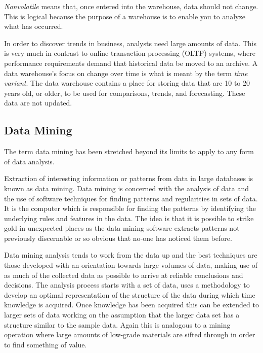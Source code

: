 \textit{Nonvolatile} means that, once entered into the warehouse, data should not change. This is
logical because the purpose of a warehouse is to enable you to analyze what has occurred.

In order to discover trends in business, analysts need large amounts of data. This is very much
in contrast to online transaction processing (OLTP) systems, where performance requirements
demand that historical data be moved to an archive. A data warehouse’s focus on change over time
is what is meant by the term \textit{time variant}. The data warehouse contains a place for storing data
that are 10 to 20 years old, or older, to be used for comparisons, trends, and forecasting. These
data are not updated.
\subsection*{Data Mining}

The term data mining has been stretched beyond its limits to apply to any form of data analysis. 

Extraction of interesting information or patterns from data in large databases is known as data
mining. Data mining is concerned with the analysis of data and the use of software techniques for
finding patterns and regularities in sets of data. It is the computer which is responsible for finding the patterns by identifying the underlying rules and features in the data. The idea is that it is possible
to strike gold in unexpected places as the data mining software extracts patterns not previously
discernable or so obvious that no-one has noticed them before.

Data mining analysis tends to work from the data up and the best techniques are those
developed with an orientation towards large volumes of data, making use of as much of the collected
data as possible to arrive at reliable conclusions and decisions. The analysis process starts with a
set of data, uses a methodology to develop an optimal representation of the structure of the data
during which time knowledge is acquired. Once knowledge has been acquired this can be extended
to larger sets of data working on the assumption that the larger data set has a structure similar to
the sample data. Again this is analogous to a mining operation where large amounts of low-grade
materials are sifted through in order to find something of value.

